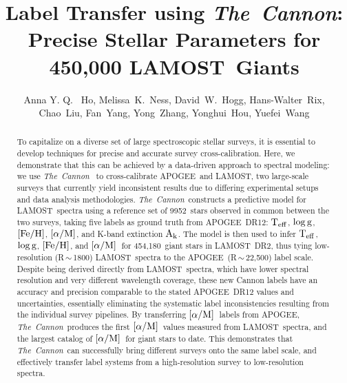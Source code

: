 \documentclass[12pt, letterpaper, preprint]{aastex}
\newcommand{\tc}{\textsl{The~Cannon}}
\newcommand{\apogee}{APOGEE}
\newcommand{\lamost}{LAMOST}
\newcommand{\teff}{\mbox{$\rm T_{eff}$}}
\newcommand{\feh}{\mbox{$\rm [Fe/H]$}}
\newcommand{\alpham}{\mbox{$\rm [\alpha/M]$}}
\newcommand{\logg}{\mbox{$\rm \log g$}}
\newcommand{\ak}{\mbox{$\rm A_k$}}
\newcommand{\ntrobj}{9952}
\newcommand{\nallobj}{454,180}
\begin{document}
\title{Label Transfer using \tc: \\
Precise Stellar Parameters for 450,000 \lamost\ Giants }
\author{Anna Y. Q. ~Ho,
Melissa~K.~Ness,
David~W.~Hogg, 
Hans-Walter~Rix,
Chao~Liu,
Fan~Yang,
Yong~Zhang,
Yonghui~Hou,
Yuefei~Wang
}


\begin{abstract}

To capitalize on a diverse set of large spectroscopic stellar surveys,
it is essential to develop techniques for precise and accurate survey cross-calibration.
Here, we demonstrate that this can be achieved by a data-driven approach to spectral modeling: we use \tc\ \citep{Ness2015} to
cross-calibrate \apogee\ and \lamost, 
two large-scale surveys
that currently yield inconsistent results
due to differing experimental setups and data
analysis methodologies.
\tc\ constructs a predictive model for \lamost\ spectra 
using a reference set of \ntrobj\ stars observed in common between the two surveys, taking five labels as ground truth from \apogee\ DR12:
\teff, \logg, \feh, \alpham, and K-band extinction \ak.
The model is then used to infer 
\teff, \logg, \feh, and \alpham\
for \nallobj\ giant stars in \lamost\ DR2,
thus tying low-resolution (R\,$\sim$\,1800) \lamost\ spectra to the
\apogee\ (R\,$\sim$\,22,500) label scale.
Despite being derived directly from \lamost\ spectra,
which have lower spectral resolution and very different
wavelength coverage,
these new Cannon labels have an accuracy and precision comparable to the stated \apogee\ DR12 values and uncertainties,
essentially eliminating the systematic label inconsistencies resulting from the individual survey pipelines.
By transferring \alpham\ labels from \apogee ,  \tc\ produces the first \alpham\ values measured from \lamost\ spectra, and the largest catalog of \alpham\ for giant stars to date.
This demonstrates that \tc\ can
successfully bring different surveys onto the same label scale,
and effectively transfer label systems from a high-resolution
survey to low-resolution spectra.

\end{abstract}
\end{document}
